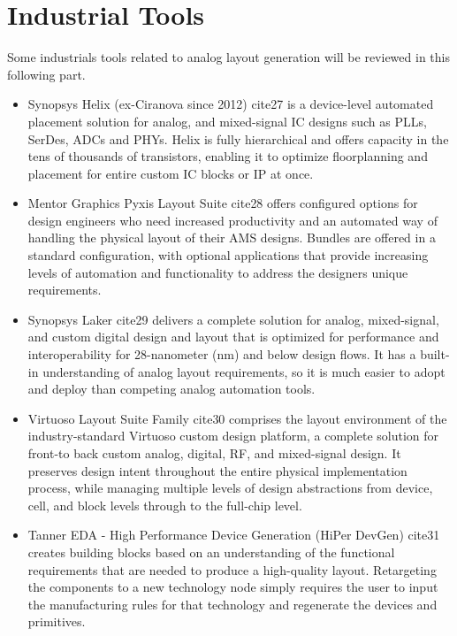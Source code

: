 \chapter{Industrial Tools}
Some industrials tools related to analog layout generation will be reviewed in this following part.
\begin{itemize}
\item Synopsys Helix (ex-Ciranova since 2012) cite{27} is a device-level automated placement solution for analog, and mixed-signal IC designs such as PLLs, SerDes, ADCs and PHYs. Helix is fully hierarchical and offers capacity in the tens of thousands of transistors, enabling it to optimize floorplanning and placement for
entire custom IC blocks or IP at once.
\item Mentor Graphics Pyxis Layout Suite cite{28} offers configured options for design engineers who need increased productivity and an automated way of handling the physical layout of their AMS designs. Bundles are offered in a standard configuration, with optional applications that provide increasing levels of automation and functionality to address the designers unique requirements.
\item Synopsys Laker cite{29} delivers a complete solution for analog, mixed-signal, and custom digital design and layout that is optimized for performance and interoperability for 28-nanometer (nm) and below design flows. It has a built-in understanding of analog layout requirements, so it is much easier to adopt and deploy than competing analog automation tools.
\item Virtuoso Layout Suite Family cite{30} comprises the layout environment of the industry-standard Virtuoso custom design platform, a complete solution for front-to back custom analog, digital, RF, and mixed-signal design. It preserves design intent throughout the entire physical implementation process, while managing multiple levels of design abstractions from device, cell, and block levels through to the full-chip level.
\item Tanner EDA - High Performance Device Generation (HiPer DevGen) cite{31} creates building blocks based on an understanding of the functional requirements that are needed to produce a high-quality layout. Retargeting the components to a new technology node simply requires the user to input the manufacturing rules for that technology and regenerate the devices and primitives.
\end{itemize}